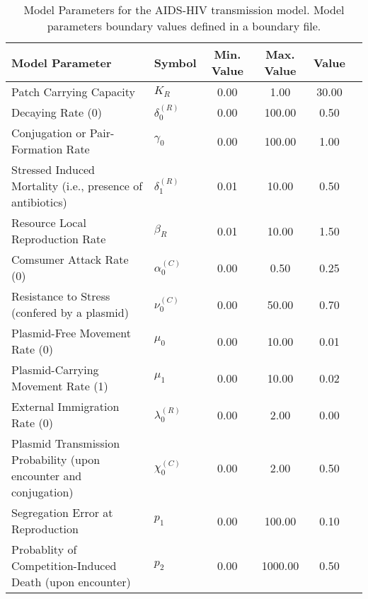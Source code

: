 \begin{table}
\centering
\begin{tabular}{p{5cm}lcccc}
{\bf Model Parameter} & {\bf Symbol} & {\bf Min. Value} & {\bf Max. Value} & {\bf Value}\\
\hline\hline
Patch Carrying Capacity & $K_R$ & 0.00 & 1.00 & 30.00\\
Decaying Rate (0) & $\delta^{(R)}_0$ & 0.00 & 100.00 & 0.50\\
Conjugation or Pair-Formation Rate & $\gamma_0$ & 0.00 & 100.00 & 1.00\\
Stressed Induced Mortality (i.e., presence of antibiotics) & $\delta^{(R)}_1$ & 0.01 & 10.00 & 0.50\\
Resource Local Reproduction Rate & $\beta_R$ & 0.01 & 10.00 & 1.50\\
Comsumer Attack Rate (0) & $\alpha^{(C)}_0$ & 0.00 & 0.50 & 0.25\\
Resistance to Stress (confered by a plasmid) & $\nu^{(C)}_0$ & 0.00 & 50.00 & 0.70\\
Plasmid-Free Movement Rate (0) & $\mu_0$ & 0.00 & 10.00 & 0.01\\
Plasmid-Carrying Movement Rate (1) & $\mu_1$ & 0.00 & 10.00 & 0.02\\
External Immigration Rate (0) & $\lambda^{(R)}_0$ & 0.00 & 2.00 & 0.00\\
Plasmid Transmission Probability (upon encounter and conjugation) & $\chi^{(C)}_0$ & 0.00 & 2.00 & 0.50\\
Segregation Error at Reproduction & $p_1$ & 0.00 & 100.00 & 0.10\\
Probablity of Competition-Induced Death (upon encounter) & $p_2$ & 0.00 & 1000.00 & 0.50\\
\hline\hline
\end{tabular}
\caption{Model Parameters for the AIDS-HIV transmission model. Model parameters boundary values defined in a boundary file.}
\end{table}
